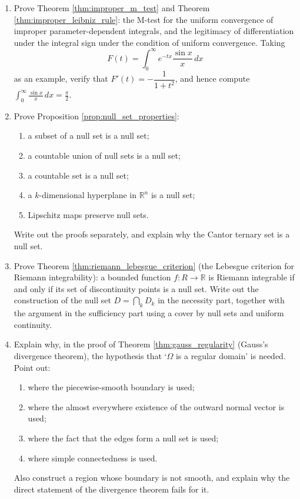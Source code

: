 \begin{enumerate}[leftmargin=3em, label=\textbf{Exercise \arabic*}]
    \item Prove Theorem \ref{thm:improper_m_test} and
    Theorem \ref{thm:improper_leibniz_rule}:
    the M-test for the uniform convergence of improper parameter-dependent integrals,
    and the legitimacy of differentiation under the integral sign under the condition of uniform convergence.
    Taking
    \[
    F(t)=\int_0^\infty e^{-tx}\frac{\sin x}{x}\,dx
    \]
    as an example, verify that $F'(t)=-\dfrac{1}{1+t^2}$,
    and hence compute $\displaystyle\int_0^\infty\frac{\sin x}{x}\,dx=\frac{\pi}{2}$.

    \item Prove Proposition \ref{prop:null_set_properties}:
    \begin{enumerate}[label=(\roman*)]
        \item a subset of a null set is a null set;
        \item a countable union of null sets is a null set;
        \item a countable set is a null set;
        \item a $k$-dimensional hyperplane in $\mathbb{R}^n$ is a null set;
        \item Lipschitz maps preserve null sets.
    \end{enumerate}
    Write out the proofs separately, and explain why the Cantor ternary set is a null set.

    \item Prove Theorem \ref{thm:riemann_lebesgue_criterion}
    (the Lebesgue criterion for Riemann integrability):
    a bounded function $f:R\to\mathbb{R}$ is Riemann integrable
    if and only if its set of discontinuity points is a null set.
    Write out the construction of the null set $D=\bigcap_k D_k$ in the necessity part,
    together with the argument in the sufficiency part using a cover by null sets and uniform continuity.

    \item Explain why, in the proof of Theorem \ref{thm:gauss_regularity} (Gauss's divergence theorem),
    the hypothesis that `$\Omega$ is a regular domain' is needed.
    Point out:
    \begin{enumerate}[label=(\roman*)]
        \item where the piecewise-smooth boundary is used;
        \item where the almost everywhere existence of the outward normal vector is used;
        \item where the fact that the edges form a null set is used;
        \item where simple connectedness is used.
    \end{enumerate}
    Also construct a region whose boundary is not smooth, and explain why the direct statement of the divergence theorem fails for it.


\end{enumerate}

